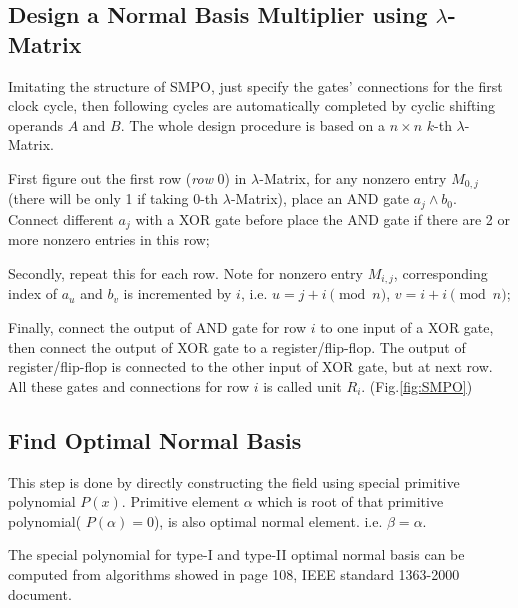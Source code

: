 \subsection{Design a Normal Basis Multiplier using $\lambda$-Matrix}
Imitating the structure of SMPO, just specify the gates' connections for the first clock cycle, then following cycles are
automatically completed by cyclic shifting operands $A$ and $B$. The whole design procedure is based on a $n \times n$ $k$-th $\lambda$-Matrix.

First figure out the first row (\emph{row} 0) in $\lambda$-Matrix, for any nonzero entry $M_{0,j}$ (there will be only 1 if taking $0$-th $\lambda$-Matrix), place an AND gate
$a_j\land b_0$. Connect different $a_j$ with a XOR gate before place the AND gate if there are 2 or more nonzero entries in this row;

Secondly, repeat this for each row. Note for nonzero entry $M_{i,j}$, corresponding index of $a_u$ and $b_v$ is incremented by $i$, i.e. $u = j + i \pmod n$, $v = i + i \pmod n$;

Finally, connect the output of AND gate for row $i$ to one input of a XOR gate, then connect the output of XOR gate to a register/flip-flop. The output of register/flip-flop is connected
to the other input of XOR gate, but at next row. All these gates and connections for row $i$ is called unit $R_i$. (Fig.\ref{fig:SMPO})

\subsection{Find Optimal Normal Basis}
This step is done by directly constructing the field using special primitive polynomial $P(x)$. Primitive element $\alpha$ which is root of that primitive polynomial( $P(\alpha)=0$),
is also optimal normal element. i.e. $\beta = \alpha$.

The special polynomial for type-I and type-II optimal normal basis can be computed from algorithms showed in page 108, IEEE standard 1363-2000 document.

